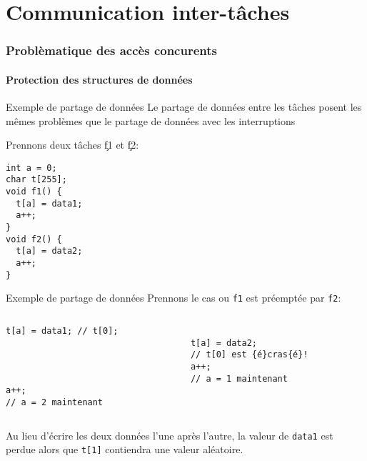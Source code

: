 %
%
%

\part{Communication inter-tâches}

\section{Problèmatique des accès concurents}

\subsection{Protection des structures de données}

\begin{frame}[fragile]{Exemple de partage de données}
  Le partage de données entre les tâches posent les mêmes problèmes que
  le partage de données avec les interruptions

  Prennons deux tâches \c{f1} et \c{f2}:
  \begin{lstlisting}
int a = 0;
char t[255];
void f1() {
  t[a] = data1;
  a++;
}
void f2() {
  t[a] = data2;
  a++;
}
       \end{lstlisting}
\end{frame} 

\begin{frame}[fragile]{Exemple de partage de données}
Prennons le cas ou \verb+f1+ est préemptée par \verb+f2+:
  \begin{columns}
    \begin{column}{5cm}
      \begin{lstlisting}[showlines=true,emptylines=10]
t[a] = data1; // t[0];




a++;
// a = 2 maintenant
       \end{lstlisting}
     \end{column}
     \begin{column}{5cm}
      \begin{lstlisting}[showlines=true,emptylines=10,escapeinside=\{\}]

t[a] = data2; 
// t[0] est {é}cras{é}!
a++;
// a = 1 maintenant


       \end{lstlisting}
    \end{column}
  \end{columns}

  Au lieu d'écrire  les deux données l'une après  l'autre, la valeur de
  \verb+data1+ est perdue alors  que \verb+t[1]+ contiendra une valeur
  aléatoire.
\end{frame} 


